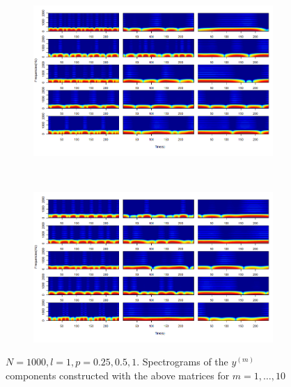 \documentclass[11pt, a4paper]{article} %
\begin{document}
\begin{figure}[H]
\begin{subfigure}{1.1\textwidth}
  \centering
  \includegraphics[width=\linewidth]{spectro_N1000_l1_y_m_1_5.png}
  \label{fig:sfig1}
\end{subfigure}\\
\begin{subfigure}{1.1\textwidth}
  \centering
  \includegraphics[width=\linewidth]{spectro_N1000_l1_y_m_6_10.png}
  \label{fig:sfig2}
\end{subfigure}
\caption{$N = 1000, l = 1, p = 0.25, 0.5, 1$. Spectrograms of the $ y^{(m)}$ components constructed with the above matrices for $m = 1, \dots, 10$  }
\label{fig:fig}
\end{figure}
\restoregeometry


\end{document}
